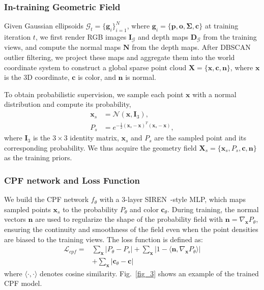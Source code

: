 \documentclass[lettersize,journal]{IEEEtran}
\begin{document}
\subsubsection{In-training Geometric Field}

Given Gaussian ellipsoids 
$\mathcal{G}_t = \{\mathbf{g}_i\}_{i=1}^N$, where $\mathbf{g}_i = \{ \mathbf{p}, \mathbf{o}, \mathbf{\Sigma}, \mathbf{c} \}$ 
at training iteration $t$, we first render RGB images $\mathbf{I}_{\mathcal{G}}$ and depth maps $\mathbf{D}_{\mathcal{G}}$ from the training views, and compute the normal maps $\mathbf{N}$ from the depth maps. 
After DBSCAN outlier filtering, 
we project these maps and aggregate them into the world coordinate system to construct a global sparse point cloud $\mathbf{X} = \{ \mathbf{x}, \mathbf{c}, \mathbf{n} \}$, where $\mathbf{x}$ is the 3D coordinate, $\mathbf{c}$ is color, and $\mathbf{n}$ is normal.

To obtain probabilistic supervision, we sample each point $\mathbf{x}$ with a normal distribution and compute its probability,
\begin{align}
    \mathbf{x}_{s} &= \mathcal{N}(\mathbf{x}, \mathbf{I}_3) \label{eq19}, \\
    P_{s} &= e^{-\frac{1}{2} \left( \mathbf{x}_{s} - \mathbf{x} \right)^{T} \left( \mathbf{x}_{s} - \mathbf{x} \right)}, \label{eq20}
\end{align}
where $\mathbf{I}_3$ is the $3\times3$ identity matrix, $\mathbf{x}_{s}$ and $P_{s}$ are the sampled point and its corresponding probability. We thus acquire the geometry field $\mathbf{X}_{s} = \{ \mathbf{x}_{s}, P_{s}, \mathbf{c}, \mathbf{n} \}$ as the training priors.

\subsubsection{CPF network and Loss Function}

We build the CPF network $f_{\theta}$ with a 3-layer SIREN~\cite{implicit}-style MLP, which maps sampled points $\mathbf{x}_{s}$ to the probability $P_{\theta}$ and color $\mathbf{c}_{\theta}$.
During training, the normal vectors $\mathbf{n}$ are used to regularize the shape of the probability field with $\mathbf{n} = \nabla_{\mathbf{x}} P_{\theta}$, ensuring the continuity and smoothness of the field even when the point densities are biased to the training views. The loss function is defined as:
\begin{equation}
    \begin{aligned}
    \mathcal{L}_{cpf} = &\sum_{\mathbf{x}} \vert P_{\theta} - P_{s} \vert + \sum_{\mathbf{x}}  \vert 1 - \langle\mathbf{n}, \nabla_{\mathbf{x}} P_{\theta}\rangle \vert \\
    &+ \sum_{\mathbf{x}} \vert \mathbf{c}_{\theta} - \mathbf{c} \vert
    \end{aligned}
    \label{eq21}
\end{equation}
where $\langle\cdot,\cdot\rangle$ denotes cosine similarity. Fig.~\ref{fig_3} shows an example of the trained CPF model.
\end{document}
